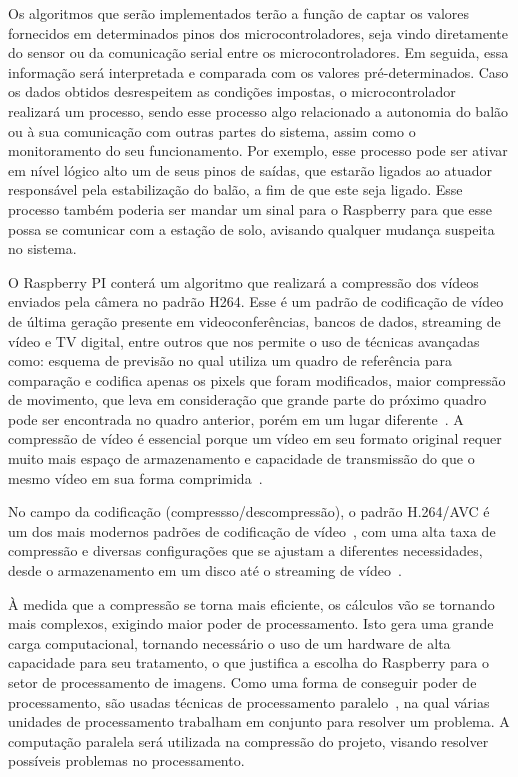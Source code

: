 		Os algoritmos que serão implementados terão a função de captar os valores fornecidos em determinados pinos dos microcontroladores, seja vindo diretamente do sensor ou da comunicação serial entre os microcontroladores. Em seguida, essa informação será interpretada e comparada com os valores pré-determinados. Caso os dados obtidos desrespeitem as condições impostas, o microcontrolador realizará um processo, sendo esse processo algo relacionado a autonomia do balão ou à sua comunicação com outras partes do sistema, assim como o monitoramento do seu funcionamento. Por exemplo, esse processo pode ser ativar em nível lógico alto um de seus pinos de saídas, que estarão ligados ao atuador responsável pela estabilização do balão, a fim de que este seja ligado. Esse processo também poderia ser mandar um sinal para o Raspberry para que esse possa se comunicar com a estação de solo, avisando qualquer mudança suspeita no sistema.

		O Raspberry PI conterá um algoritmo que realizará a compressão dos vídeos enviados pela câmera no padrão H264.		Esse é um padrão de codificação de vídeo de última geração presente em videoconferências, bancos de dados, streaming de vídeo e TV digital, entre outros que nos permite o uso de técnicas avançadas como: esquema de previsão no qual utiliza um quadro de referência para comparação e codifica apenas os pixels que foram modificados, maior compressão de movimento, que leva em consideração que grande parte do próximo quadro pode ser encontrada no quadro anterior, porém em um lugar diferente~\cite{axis1}. A compressão de vídeo é essencial porque um vídeo em seu formato original requer muito mais espaço de armazenamento e capacidade de transmissão do que o mesmo vídeo em sua forma comprimida~\cite{ostermann}.

		No campo da codificação (compressso/descompressão), o padrão H.264/AVC é um dos mais modernos padrões de codificação de vídeo~\cite{sullivan}, com uma alta taxa de compressão e diversas configurações que se ajustam a diferentes necessidades, desde o armazenamento em um disco até o streaming de vídeo~\cite{wiegand}.

		À medida que a compressão se torna mais eficiente, os cálculos vão se tornando mais complexos, exigindo maior poder de processamento. Isto gera uma grande carga computacional, tornando necessário o uso de um hardware de alta capacidade para seu tratamento, o que justifica a escolha do Raspberry para o setor de processamento de imagens. Como uma forma de conseguir poder de processamento, são usadas técnicas de processamento paralelo~\cite{mattson}, na qual várias unidades de processamento trabalham em conjunto para resolver um problema. A computação paralela será utilizada na compressão do projeto, visando resolver possíveis problemas no processamento.

